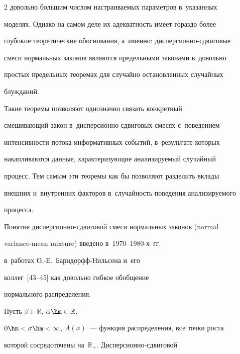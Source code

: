 \begin{multicols}{2}
довольно большим числом настраиваемых па\-ра\-мет\-ров в~указанных


моделях. Однако на самом деле их адекватность имеет гораздо более


глубокие теоретические обоснования, а~именно: дис\-пер\-си\-он\-но-сдви\-го\-вые


смеси нормальных законов являются предельными законами в~довольно


прос\-тых предельных теоремах для случайно остановленных случайных


блуж\-да\-ний. 





Такие теоремы позволяют однозначно связать конкретный


смешивающий закон в~дис\-пер\-си\-он\-но-сдви\-го\-вых смесях с~поведением


интенсивности потока информативных событий, в~результате которых


накапливаются данные, характеризующие анализируемый случайный


процесс. Тем самым эти теоремы как бы позволяют разделить вклады


внешних и~внутренних факторов в~случайность поведения анализируемого


процесса.





\columnbreak





Понятие дисперсионно-сдвиговой смеси нормальных законов (normal


variance-mean mixture) введено в~1970--1980-х~гг.\


 в~работах О.-Е.~Барн\-дорфф-Ниль\-се\-на и~его 


коллег~[43--45] как довольно гибкое обобщение


нормального распреде\-ления.


{





}





Пусть $\beta\in\mathbb{R}$, $\alpha\hm\in\mathbb{R}$,


$0\hm<\sigma\hm<\infty$, $A(x)$~--- функция распределения, все точки роста


которой сосредоточены на~$\mathbb{R}_+$. Дис\-пер\-си\-он\-но-сдви\-го\-вой



\end{multicols}

